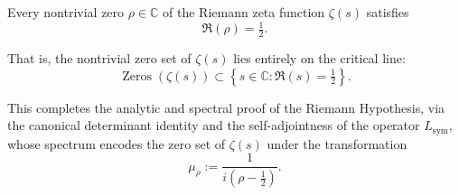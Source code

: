 \begin{theorem}
\label{thm:truth_of_rh}
Every nontrivial zero \( \rho \in \mathbb{C} \) of the Riemann zeta function \( \zeta(s) \) satisfies
\[
\Re(\rho) = \tfrac{1}{2}.
\]

\medskip
\noindent
That is, the nontrivial zero set of \( \zeta(s) \) lies entirely on the critical line:
\[
\operatorname{Zeros}(\zeta(s)) \subset \left\{ s \in \mathbb{C} : \Re(s) = \tfrac{1}{2} \right\}.
\]

\medskip
\noindent
This completes the analytic and spectral proof of the Riemann Hypothesis, via the canonical determinant identity and the self-adjointness of the operator \( L_{\mathrm{sym}} \), whose spectrum encodes the zero set of \( \zeta(s) \) under the transformation
\[
\mu_\rho := \frac{1}{i(\rho - \tfrac{1}{2})}.
\]
\end{theorem}
